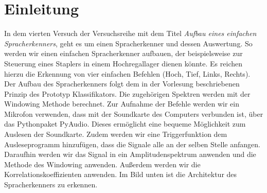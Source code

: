 \documentclass[12pt, oneside, a4paper, \docLanguage]{report}
\begin{document}

\setcounter{section}{0}



\clearpage

%
%


%
%


%
%


%
%




\setcounter{page}{1} 
\pagestyle{default}
%
%
\chapter{Einleitung}
\label{chap:EINL}

In dem vierten Versuch der Versuchsreihe mit dem Titel  \textit{Aufbau eines einfachen Spracherkenners}, geht es um einen Spracherkenner und dessen Auswertung.
\newline
So werden wir einen einfachen Spracherkenner aufbauen, der beispielsweise zur Steuerung eines Staplers in einem Hochregallager dienen könnte.
\newline
Es reichen hierzu die Erkennung von vier einfachen Befehlen (Hoch, Tief, Links, Rechts). Der Aufbau  des Spracherkenners folgt dem in der Vorlesung beschriebenen Prinzip des Prototyp Klassifikators. 
\newline
\newline
Die zugehörigen Spektren werden mit der Windowing Methode berechnet. Zur Aufnahme der Befehle werden wir ein Mikrofon verwenden, dass mit der Soundkarte des Computers verbunden ist, über das Pythonpaket PyAudio.
\newline
Dieses ermöglicht eine bequeme Möglichkeit zum Auslesen der Soundkarte.
Zudem werden wir eine Triggerfunktion dem Ausleseprogramm hinzufügen, dass die Signale alle an der selben Stelle anfangen.
\newline
Daraufhin werden wir das Signal in ein Amplitudenspektrum anwenden und die Methode des Windowing anwenden.
Außerdem werden wir die Korrelationskoeffizienten anwenden.
Im Bild unten ist die Architektur des Spracherkenners zu erkennen.
\end{document}
